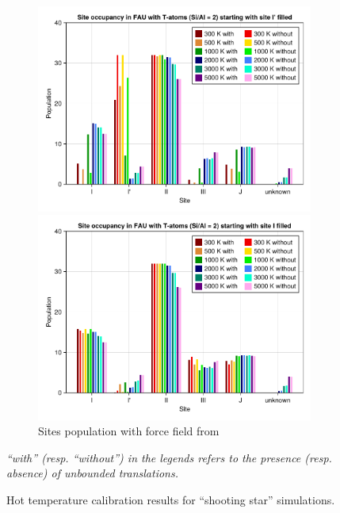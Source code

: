 \documentclass[main.tex]{subfiles}
\begin{document}
\begin{figure}
\vspace{1em}

	\begin{subfigure}{\linewidth}
		\begin{minipage}{0.5\linewidth}
			\centering
			\includegraphics[width=\linewidth]{figures/cations/temperaturecalibration_FAU_T_logicalstart.pdf}
		\end{minipage}\hfill%
		\begin{minipage}{0.5\linewidth}
			\centering
			\includegraphics[width=\linewidth]{figures/cations/temperaturecalibration_FAU_T_absurdstart.pdf}
		\end{minipage}
		\caption{Sites population with force field from \textcite{DiLellaFF}}
	\end{subfigure}

	\caption{Hot temperature calibration results for ``shooting star'' simulations.}\label{fig:temperaturecalibration}
	\textsl{``with'' (resp. ``without'') in the legends refers to the presence (resp. absence) of unbounded translations.}
\end{figure}
\end{document}
